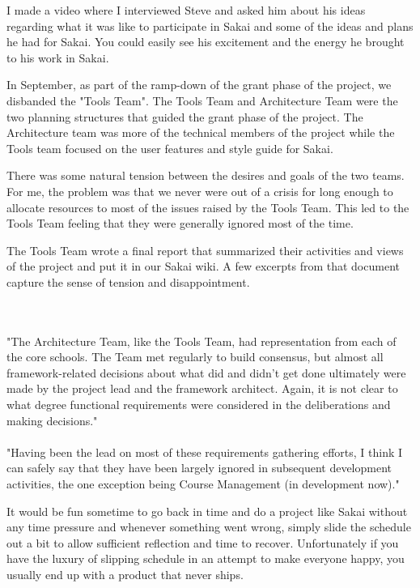 \documentclass[12pt]{book}
\begin{document}
I made a video where I interviewed Steve and asked him
about his ideas regarding what it was like to
participate in Sakai and some of the ideas and plans
he had for Sakai.   You could easily see his excitement
and the energy he brought to his work in Sakai.

In September, as part of the ramp-down of the
grant phase of the project, we disbanded the "Tools
Team".  The Tools Team and Architecture Team were the
two planning structures that guided the grant phase of the
project.   The Architecture team was more of the
technical members of the project while the Tools
team focused on the user features and style guide
for Sakai.

There was some natural tension between the desires
and goals of the two teams.  For me, the problem
was that we never were out of a crisis for long
enough to allocate resources to most of the issues
raised by the Tools Team.  This led to the Tools
Team feeling that they were generally ignored most
of the time.


The Tools Team wrote a final report that summarized their
activities and views of the project and put it in
our Sakai wiki.  A few excerpts from that document
capture the sense of tension and disappointment.\\
\\
\begin{sf}
\\
"The Architecture Team, like the Tools Team,
had representation from each of the core schools. The
Team met regularly to build consensus, but almost all
framework-related decisions about what did and didn't
get done ultimately were made by the project lead and the
framework architect. Again, it is not clear to what
degree functional requirements were considered in the
deliberations and making decisions."\\
\\
"Having been the lead on most of these
requirements gathering efforts, I think I can safely say
that they have been largely ignored in subsequent
development activities, the one exception being Course
Management (in development now)."\\
\end{sf}

It would be fun sometime to go back in time and do a project like
Sakai without any time pressure and whenever something
went wrong, simply slide the schedule out a bit to allow
sufficient reflection and time to recover.  Unfortunately
if you have the luxury of slipping schedule in an attempt
to make everyone happy, you usually end up with a product
that never ships.
\end{document}
